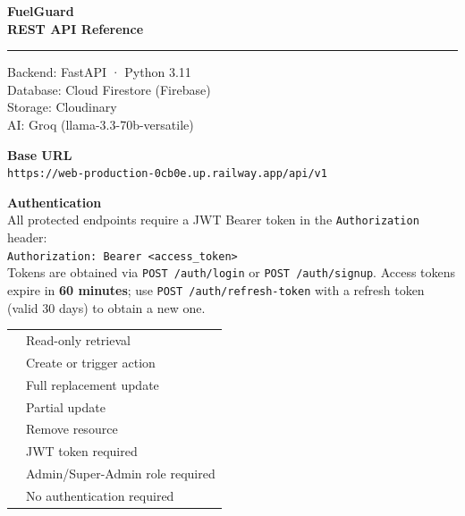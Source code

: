 \documentclass[12pt,a4paper]{article}
\newcommand{\methodbadge}[2]{%
  \tcbox[on line, arc=3pt, outer arc=3pt,
    colback=#1, colframe=#1, colupper=white,
    boxsep=1pt, left=4pt, right=4pt, top=2pt, bottom=2pt,
    fontupper=\bfseries\small\sffamily]{#2}%
}
\newcommand{\GET}{\methodbadge{getblue}{GET}}
\newcommand{\POST}{\methodbadge{postgreen}{POST}}
\newcommand{\PUT}{\methodbadge{putorange}{PUT}}
\newcommand{\DELETE}{\methodbadge{deletered}{DELETE}}
\newcommand{\PATCH}{\methodbadge{patchpurple}{PATCH}}
\newcommand{\authrequired}{\tcbox[on line, arc=3pt,
  colback=tagbg, colframe=tagfg, colupper=tagfg,
  boxsep=1pt, left=3pt, right=3pt, top=1pt, bottom=1pt,
  fontupper=\tiny\bfseries\sffamily]{🔒 AUTH}}
\newcommand{\adminonly}{\tcbox[on line, arc=3pt,
  colback=reqbg, colframe=putorange, colupper=putorange,
  boxsep=1pt, left=3pt, right=3pt, top=1pt, bottom=1pt,
  fontupper=\tiny\bfseries\sffamily]{ADMIN}}
\newcommand{\noauth}{\tcbox[on line, arc=3pt,
  colback=resbg, colframe=postgreen, colupper=postgreen,
  boxsep=1pt, left=3pt, right=3pt, top=1pt, bottom=1pt,
  fontupper=\tiny\bfseries\sffamily]{PUBLIC}}
\begin{document}

\begin{titlepage}
  \centering
  \vspace*{2cm}
  {\Huge\bfseries\color{navydark} FuelGuard\\[6pt]
   \huge REST API Reference\par}
  \vspace{0.5cm}
  \textcolor{bordergray}{\rule{10cm}{0.4pt}}
  \vspace{0.5cm}

  {\large\color{textgray}
    Backend: FastAPI · Python 3.11\\
    Database: Cloud Firestore (Firebase)\\
    Storage: Cloudinary\\
    AI: Groq (llama-3.3-70b-versatile)
  }

  \vspace{1.5cm}
  \begin{tcolorbox}[
    colback=bglight, colframe=bordergray, arc=6pt,
    width=10cm, halign=center
  ]
    \textbf{Base URL}\\[4pt]
    \texttt{\small https://web-production-0cb0e.up.railway.app/api/v1}
  \end{tcolorbox}

  \vspace{1.5cm}
  \begin{tcolorbox}[colback=tagbg, colframe=tagfg, arc=6pt, width=12cm]
    \textbf{\color{tagfg}Authentication}\\[4pt]
    \small All protected endpoints require a JWT Bearer token in the
    \texttt{Authorization} header:\\[4pt]
    \texttt{Authorization: Bearer \textless access\_token\textgreater}\\[4pt]
    Tokens are obtained via \texttt{POST /auth/login} or \texttt{POST /auth/signup}.
    Access tokens expire in \textbf{60 minutes}; use \texttt{POST /auth/refresh-token}
    with a refresh token (valid 30 days) to obtain a new one.
  \end{tcolorbox}

  \vspace{1.5cm}
  \begin{tabular}{ll}
    \GET    & Read-only retrieval \\[4pt]
    \POST   & Create or trigger action \\[4pt]
    \PUT    & Full replacement update \\[4pt]
    \PATCH  & Partial update \\[4pt]
    \DELETE & Remove resource \\[8pt]
    \authrequired & JWT token required \\[4pt]
    \adminonly    & Admin/Super-Admin role required \\[4pt]
    \noauth       & No authentication required \\
  \end{tabular}


\end{titlepage}
\end{document}
